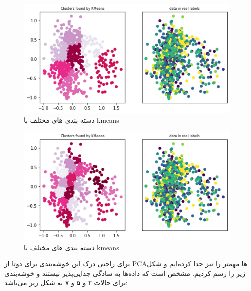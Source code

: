 \documentclass{article}
\begin{document}
\begin{figure}[h]
	\centering
	\includegraphics[width=0.5\linewidth]{Photo/download}
	\caption[دسته بندی های مختلف با kmeans]{دسته بندی های مختلف با kmeans}
	\label{fig:download}
\end{figure}
\begin{figure}[h]
	\centering
	\includegraphics[width=0.5\linewidth]{Photo/download1}
	\caption[دسته بندی های مختلف با kmeans]{دسته بندی های مختلف با kmeans}
	\label{fig:download1}
\end{figure}
برای راحتی درک این خوشه‌بندی برای دوتا از PCAها مهمتر را نیز جدا کرده‌ایم و شکل زیر را رسم کردیم.  مشخص است که داده‌ها به سادگی جدایی‌پذیر نیستند و خوشه‌بندی برای حالات ۲ و ۵ و ۷ به شکل زیر می‌باشد:
\end{document}
